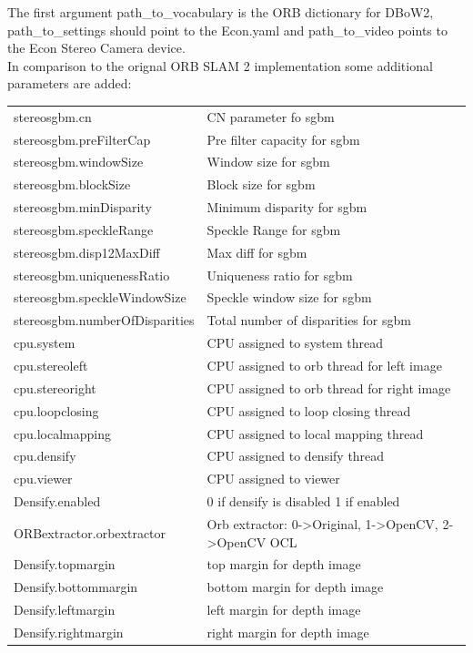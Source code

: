 \documentclass[11pt,a4paper,titlepage,oneside]{report}
\begin{document}
The first argument path\_to\_vocabulary is the ORB dictionary for DBoW2, path\_to\_settings should point to the Econ.yaml and path\_to\_video points to the Econ Stereo Camera device.\\
In comparison to the orignal ORB SLAM 2 implementation some additional parameters are added:\\
\begin{tabular}{l l}
stereosgbm.cn & CN parameter fo sgbm \\
stereosgbm.preFilterCap & Pre filter capacity for sgbm \\
stereosgbm.windowSize & Window size for sgbm \\
stereosgbm.blockSize & Block size for sgbm \\
stereosgbm.minDisparity & Minimum disparity for sgbm \\
stereosgbm.speckleRange &  Speckle Range for sgbm \\
stereosgbm.disp12MaxDiff & Max diff for sgbm \\
stereosgbm.uniquenessRatio & Uniqueness ratio for sgbm \\
stereosgbm.speckleWindowSize & Speckle window size for sgbm \\
stereosgbm.numberOfDisparities & Total number of disparities for sgbm \\
cpu.system & CPU assigned to system thread \\
cpu.stereoleft & CPU assigned to orb thread for left image \\
cpu.stereoright & CPU assigned to orb thread for right image \\
cpu.loopclosing & CPU assigned to loop closing thread \\
cpu.localmapping & CPU assigned to local mapping thread \\
cpu.densify & CPU assigned to densify thread \\
cpu.viewer & CPU assigned to viewer \\
Densify.enabled & 0 if densify is disabled 1 if enabled \\
ORBextractor.orbextractor & Orb extractor: 0->Original, 1->OpenCV, 2->OpenCV OCL \\
Densify.topmargin & top margin for depth image \\
Densify.bottommargin & bottom margin for depth image \\
Densify.leftmargin & left margin for depth image \\
Densify.rightmargin & right margin for depth image \\
\end{tabular}\\
\end{document}
